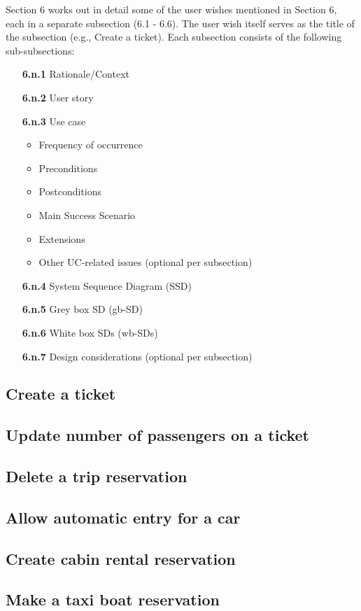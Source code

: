 Section 6 works out in detail some of the user wishes mentioned in Section 6, each in a separate subsection (6.1 - 6.6). The
user wish itself serves as the title of the subsection (e.g., Create a ticket). Each subsection consists of the
following sub-subsections:
\begin{enumerate}
    \item[\textbf{6.n.1}] Rationale/Context
    \item[\textbf{6.n.2}] User story
    \item[\textbf{6.n.3}] Use case
    \begin{itemize}
        \item Frequency of occurrence
        \item Preconditions
        \item Postconditions
        \item Main Success Scenario
        \item Extensions
        \item Other UC-related issues (optional per subsection)
    \end{itemize}
    \item[\textbf{6.n.4}] System Sequence Diagram (SSD)
    \item[\textbf{6.n.5}] Grey box SD (gb-SD)
    \item[\textbf{6.n.6}] White box SDs (wb-SDs)
    \item[\textbf{6.n.7}] Design considerations (optional per subsection)
\end{enumerate}
\newpage

\subsection{Create a ticket}

\newpage

\subsection{Update number of passengers on a ticket}

\newpage

\subsection{Delete a trip reservation}

\newpage

\subsection{Allow automatic entry for a car}

\newpage

\subsection{Create cabin rental reservation}

\newpage

\subsection{Make a taxi boat reservation}

\newpage